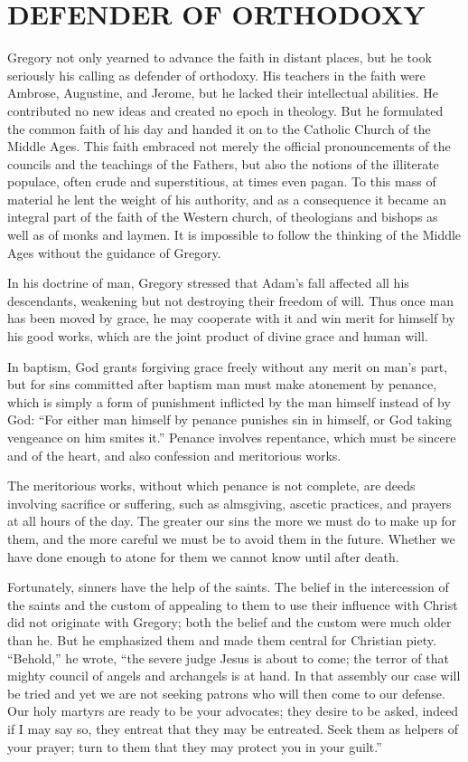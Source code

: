 \section{DEFENDER OF ORTHODOXY}

Gregory not only yearned to advance the faith in distant places, but he took seriously his calling
as defender of orthodoxy. His teachers in the faith were Ambrose, Augustine, and Jerome, but he
lacked their intellectual abilities. He contributed no new ideas and created no epoch in theology.
But he formulated the common faith of his day and handed it on to the Catholic Church of the Middle
Ages. This faith embraced not merely the official pronouncements of the councils and the teachings
of the Fathers, but also the notions of the illiterate populace, often crude and superstitious, at
times even pagan. To this mass of material he lent the weight of his authority, and as a consequence
it became an integral part of the faith of the Western church, of theologians and bishops as well as
of monks and laymen. It is impossible to follow the thinking of the Middle Ages without the guidance
of Gregory.

In his doctrine of man, Gregory stressed that Adam’s fall affected all his descendants, weakening
but not destroying their freedom of will. Thus once man has been moved by grace, he may cooperate
with it and win merit for himself by his good works, which are the joint product of divine grace and
human will.

In baptism, God grants forgiving grace freely without any merit on man’s part, but for sins
committed after baptism man must make atonement by penance, which is simply a form of punishment
inflicted by the man himself instead of by God: “For either man himself by penance punishes sin in
himself, or God taking vengeance on him smites it.” Penance involves repentance, which must be
sincere and of the heart, and also confession and meritorious works.

The meritorious works, without which penance is not complete, are deeds involving sacrifice or
suffering, such as almsgiving, ascetic practices, and prayers at all hours of the day. The greater
our sins the more we must do to make up for them, and the more careful we must be to avoid them in
the future. Whether we have done enough to atone for them we cannot know until after death.

Fortunately, sinners have the help of the saints. The belief in the intercession of the saints and
the custom of appealing to them to use their influence with Christ did not originate with Gregory;
both the belief and the custom were much older than he. But he emphasized them and made them central
for Christian piety. “Behold,” he wrote, “the severe judge Jesus is about to come; the terror of
that mighty council of angels and archangels is at hand. In that assembly our case will be tried and
yet we are not seeking patrons who will then come to our defense. Our holy martyrs are ready to be
your advocates; they desire to be asked, indeed if I may say so, they entreat that they may be
entreated. Seek them as helpers of your prayer; turn to them that they may protect you in your
guilt.”

